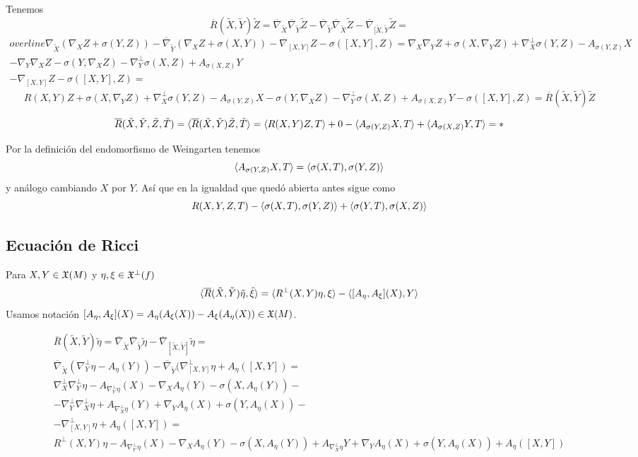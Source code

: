 \documentclass[GSR.tex]{subfiles}
\begin{document}
Tenemos 
$$\overline{R}(\tilde{X},\tilde{Y})\tilde{Z}=\overline{\nabla}_{\tilde{X}}\overline{\nabla}_{\tilde{Y}}\tilde{Z}-\overline{\nabla}_{\tilde{Y}}\overline{\nabla}_{\tilde{X}}\tilde{Z}-\overline{\nabla}_{[\tilde{X},\tilde{Y}}\tilde{Z}=$$
\begin{gather*}
overline{\nabla}_{\tilde{X}}(\nabla_XZ+\sigma(Y,Z))-\overline{\nabla}_{\tilde{Y}}(\nabla_XZ+\sigma(X,Y))-\nabla_{[X,Y]}Z-\sigma([X,Y],Z)=\nabla_X\nabla_YZ+\sigma(X,\nabla_YZ)+\nabla^\perp_X\sigma(Y,Z)-A_{\sigma(Y,Z)}X\\
-\nabla_Y\nabla_XZ-\sigma(Y,\nabla_XZ)-\nabla_Y^\perp\sigma(X,Z)+A_{\sigma(X,Z)}Y\\
-\nabla_{[X,Y]}Z-\sigma([X,Y],Z)=
\end{gather*}
\begin{equation}\label{A}
R(X,Y)Z+\sigma(X,\nabla_YZ)+\nabla_X^\perp\sigma(Y,Z)-A_{\sigma(Y,Z)}X-\sigma(Y,\nabla_XZ)-\nabla_Y^\perp\sigma(X,Z)+A_{\sigma(X,Z)}Y-\sigma([X,Y],Z)=\overline{R}(\tilde{X},\tilde{Y})\tilde{Z}
\end{equation}

\[
\overline{R}(\tilde{X},\tilde{Y},\tilde{Z},\tilde{T})=\langle{\overline{R}(\tilde{X},\tilde{Y})\tilde{Z},\tilde{T}}\rangle=\langle{R(X,Y)Z,T}\rangle+0-\langle{A_{\sigma(Y,Z)}X,T}\rangle+\langle{A_{\sigma(X,Z)}Y,T}\rangle=\ast
\]

Por la definición del endomorfismo de Weingarten tenemos
\[
\langle{A_{\sigma(Y,Z)}X,T}\rangle=\langle{\sigma(X,T),\sigma(Y,Z)}\rangle
\]
y análogo cambiando $X$ por $Y$. Así que en la igualdad que quedó abierta antes sigue como
\[
R(X,Y,Z,T)-\langle{\sigma(X,T),\sigma(Y,Z)}\rangle+\langle{\sigma(Y,T),\sigma(X,Z)}\rangle
\]

\subsection{Ecuación de Ricci}

Para $X,Y\in{\mathfrak{X}}(M)$ y $\eta,\xi\in{\mathfrak{X}}^\perp(f)$
\[
\langle{\overline{R}(\tilde{X},\tilde{Y})\tilde{\eta},\tilde{\xi}}\rangle=\langle{R^\perp(X,Y)\eta,\xi}\rangle-\langle{[A_\eta,A_\xi](X),Y}\rangle
\]
Usamos notación $[A_\eta,A_\xi](X)=A_\eta(A_\xi(X))-A_\xi(A_\eta(X))\in{\mathfrak{X}}(M)$.

\begin{gather*}
\overline{R}(\tilde{X},\tilde{Y})\tilde{\eta}=\overline{\nabla}_{\tilde{X}}\overline{\nabla}_{\tilde{Y}}\tilde{\eta}-\overline{\nabla}_{[\tilde{X},\tilde{Y}]}\tilde{\eta}=\\
\overline{\nabla}_{\tilde{X}}(\nabla_Y^\perp\eta-A_\eta(Y))-\overline{\nabla}_{\tilde{Y}}(\nabla^\perp_{[X,Y]}\eta+A_{\eta}([X,Y])=\\
\nabla^\perp_X\nabla_Y^\perp\eta-A_{\nabla^\perp_Y\eta}(X)-\nabla_XA_\eta(Y)-\sigma(X,A_\eta(Y))-\\
-\nabla_Y^\perp\nabla_X^\perp\eta+A_{\nabla_X^\perp\eta}(Y)+\nabla_YA_\eta(X)+\sigma(Y,A_\eta(X))-\\
-\nabla^\perp_{[X,Y]}\eta+A_\eta([X,Y])=\\
R^\perp(X,Y)\eta-A_{\nabla^\perp_Y\eta}(X)-\nabla_XA_\eta(Y)-\sigma(X,A_\eta(Y))+A_{\nabla^\perp_X\eta}Y+\nabla_YA_\eta(X)+\sigma(Y,A_\eta(X))+A_\eta([X,Y])
\end{gather*}
\end{document}
